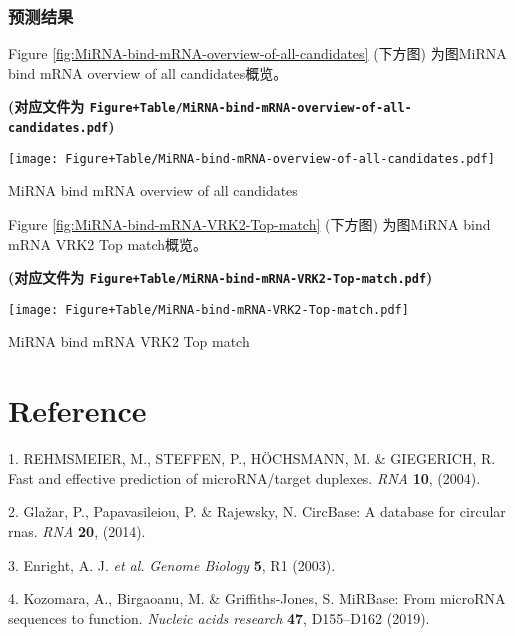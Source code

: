\documentclass[
]{article}
\newenvironment{cslreferences}%
  {}%
  {\par}
\begin{document}
\hypertarget{res1}{%
\subsubsection{预测结果}\label{res1}}

Figure \ref{fig:MiRNA-bind-mRNA-overview-of-all-candidates} (下方图) 为图MiRNA bind mRNA overview of all candidates概览。

\textbf{(对应文件为 \texttt{Figure+Table/MiRNA-bind-mRNA-overview-of-all-candidates.pdf})}

\def\@captype{figure}
\begin{center}
\texttt{[image: Figure+Table/MiRNA-bind-mRNA-overview-of-all-candidates.pdf]}
\caption{MiRNA bind mRNA overview of all candidates}\label{fig:MiRNA-bind-mRNA-overview-of-all-candidates}
\end{center}

Figure \ref{fig:MiRNA-bind-mRNA-VRK2-Top-match} (下方图) 为图MiRNA bind mRNA VRK2 Top match概览。

\textbf{(对应文件为 \texttt{Figure+Table/MiRNA-bind-mRNA-VRK2-Top-match.pdf})}

\def\@captype{figure}
\begin{center}
\texttt{[image: Figure+Table/MiRNA-bind-mRNA-VRK2-Top-match.pdf]}
\caption{MiRNA bind mRNA VRK2 Top match}\label{fig:MiRNA-bind-mRNA-VRK2-Top-match}
\end{center}

\hypertarget{bibliography}{%
\section*{Reference}\label{bibliography}}

\hypertarget{refs}{}
\begin{cslreferences}
\leavevmode\hypertarget{ref-FastAndEffectRehmsm2004}{}%
1. REHMSMEIER, M., STEFFEN, P., HÖCHSMANN, M. \& GIEGERICH, R. Fast and effective prediction of microRNA/target duplexes. \emph{RNA} \textbf{10}, (2004).

\leavevmode\hypertarget{ref-CircbaseADatGlazar2014}{}%
2. Glažar, P., Papavasileiou, P. \& Rajewsky, N. CircBase: A database for circular rnas. \emph{RNA} \textbf{20}, (2014).

\leavevmode\hypertarget{ref-Enrigh2003}{}%
3. Enright, A. J. \emph{et al.} \emph{Genome Biology} \textbf{5}, R1 (2003).

\leavevmode\hypertarget{ref-MirbaseFromMKozoma2019}{}%
4. Kozomara, A., Birgaoanu, M. \& Griffiths-Jones, S. MiRBase: From microRNA sequences to function. \emph{Nucleic acids research} \textbf{47}, D155--D162 (2019).
\end{cslreferences}
\end{document}
